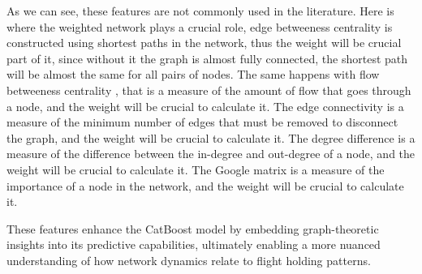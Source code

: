 As we can see, these features are not commonly used in the literature. Here is where the weighted network plays a crucial role, edge betweeness centrality \cite{newman2004finding} is constructed using shortest paths in the network, thus the weight will be crucial part of it, since without it the graph is almost fully connected, the shortest path will be almost the same for all pairs of nodes. The same happens with flow betweeness centrality \cite{brandes2001faster}, that is a measure of the amount of flow that goes through a node, and the weight will be crucial to calculate it. The edge connectivity \cite{tarjan1972depth} is a measure of the minimum number of edges that must be removed to disconnect the graph, and the weight will be crucial to calculate it. The degree difference is a measure of the difference between the in-degree and out-degree of a node, and the weight will be crucial to calculate it. The Google matrix is a measure of the importance of a node in the network, and the weight will be crucial to calculate it.

These features enhance the CatBoost model by embedding graph-theoretic insights into its predictive capabilities, ultimately enabling a more nuanced understanding of how network dynamics relate to flight holding patterns.
